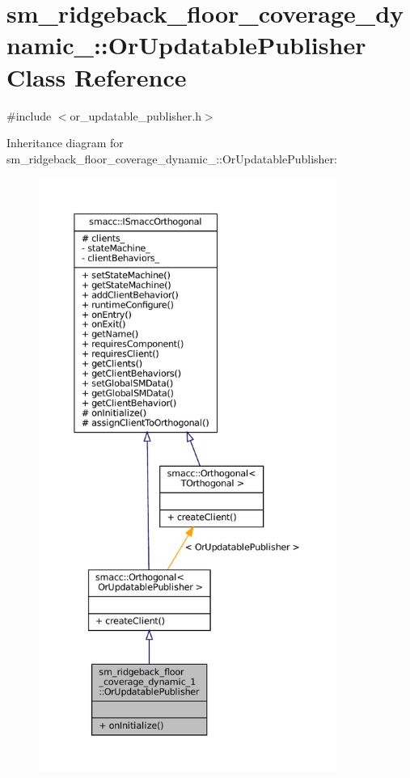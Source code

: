 \hypertarget{classsm__ridgeback__floor__coverage__dynamic__1_1_1OrUpdatablePublisher}{}\section{sm\+\_\+ridgeback\+\_\+floor\+\_\+coverage\+\_\+dynamic\+\_\+:\+:Or\+Updatable\+Publisher Class Reference}
\label{classsm__ridgeback__floor__coverage__dynamic__1_1_1OrUpdatablePublisher}


{\ttfamily \#include $<$or\+\_\+updatable\+\_\+publisher.\+h$>$}



Inheritance diagram for sm\+\_\+ridgeback\+\_\+floor\+\_\+coverage\+\_\+dynamic\+\_\+:\+:Or\+Updatable\+Publisher\+:
\nopagebreak
\begin{figure}[H]
\begin{center}
\leavevmode
\includegraphics[height=550pt]{classsm__ridgeback__floor__coverage__dynamic__1_1_1OrUpdatablePublisher__inherit__graph}
\end{center}
\end{figure}


